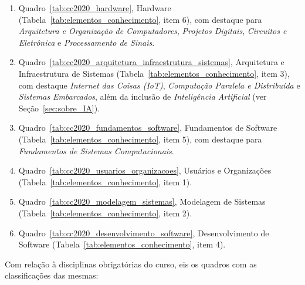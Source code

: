 \begin{enumerate}
\item Quadro~\ref{tab:cc2020_hardware}, Hardware (Tabela~\ref{tab:elementos_conhecimento}, item 6), com destaque para \textit{Arquitetura e Organização de Computadores}, \textit{Projetos Digitais}, \textit{Circuitos e Eletrônica} e \textit{Processamento de Sinais}.
\item Quadro~\ref{tab:cc2020_arquitetura_infraestrutura_sistemas}, Arquitetura e Infraestrutura de Sistemas (Tabela~\ref{tab:elementos_conhecimento}, item 3), com destaque \textit{Internet das Coisas (IoT)}, \textit{Computação Paralela e Distribuída} e \textit{Sistemas Embarcados}, além da inclusão de \textit{Inteligência Artificial} (ver Seção~\ref{sec:sobre_IA}).
\item Quadro~\ref{tab:cc2020_fundamentos_software}, Fundamentos de Software (Tabela~\ref{tab:elementos_conhecimento}, item 5), com destaque para \textit{Fundamentos de Sistemas Computacionais}.
\item Quadro~\ref{tab:cc2020_usuarios_organizacoes}, Usuários e Organizações (Tabela~\ref{tab:elementos_conhecimento}, item 1).
\item Quadro~\ref{tab:cc2020_modelagem_sistemas}, Modelagem de Sistemas (Tabela~\ref{tab:elementos_conhecimento}, item 2).
\item Quadro~\ref{tab:cc2020_desenvolvimento_software}, Desenvolvimento de Software (Tabela~\ref{tab:elementos_conhecimento}, item 4).
\end{enumerate}

Com relação à disciplinas obrigatórias do curso, eis os quadros com as classificações das mesmas:
















